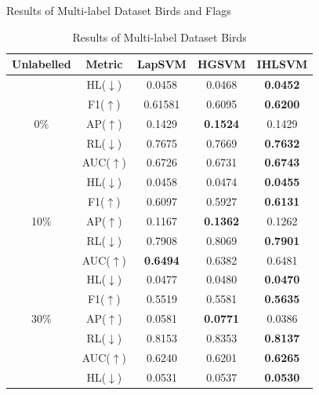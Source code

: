 \documentclass[12pt,a4paper,oneside,english]{report}
\begin{document}
%
\begin{table}[htbp]
    \caption{Results of Multi-label Dataset Birds and Flags}
    \tiny
    \noindent
    \label{tabel_ml_start}
    \begin{minipage}[t]{0.48\textwidth}
        \centering
        \caption*{Results of Multi-label Dataset Birds}
        \begin{tabular}{|c|c|c|c|c|}
            \hline
            \textbf{Unlabelled} & \textbf{Metric} & \textbf{LapSVM} & \textbf{HGSVM} & \textbf{IHLSVM} \\
            \hline
            & HL(\(\downarrow \)) & 0.0458 & 0.0468 & \textbf{0.0452} \\
            & F1(\(\uparrow\))    & 0.61581 & 0.6095 & \textbf{0.6200} \\
            0\(\%\) & AP(\(\uparrow\))  & 0.1429 & \textbf{0.1524} & 0.1429 \\
            & RL(\(\downarrow \)) & 0.7675 & 0.7669 & \textbf{0.7632} \\
            & AUC(\(\uparrow \))  & 0.6726 & 0.6731 & \textbf{0.6743} \\
            \hline
            & HL(\(\downarrow \))  & 0.0458 & 0.0474 & \textbf{0.0455} \\
            & F1(\(\uparrow\))     & 0.6097 & 0.5927 & \textbf{0.6131} \\
            10\(\%\) & AP(\(\uparrow\))   & 0.1167 & \textbf{0.1362} & 0.1262 \\
            & RL(\(\downarrow \))  & 0.7908 & 0.8069 & \textbf{0.7901} \\
            & AUC(\(\uparrow \))   & \textbf{0.6494} & 0.6382 & 0.6481 \\
            \hline
            & HL(\(\downarrow \))  & 0.0477 & 0.0480 & \textbf{0.0470} \\
            & F1(\(\uparrow\))     & 0.5519 & 0.5581 & \textbf{0.5635} \\
            30\(\%\) & AP(\(\uparrow\))   & 0.0581 & \textbf{0.0771} & 0.0386 \\
            & RL(\(\downarrow \))  & 0.8153 & 0.8353 & \textbf{0.8137} \\
            & AUC(\(\uparrow \))   & 0.6240 & 0.6201 & \textbf{0.6265} \\
            \hline
            & HL(\(\downarrow \))  & 0.0531 & 0.0537 & \textbf{0.0530} \\

\end{tabular}
\end{minipage}
\end{table}
\end{document}
